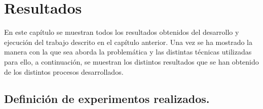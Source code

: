 
\chapter{Resultados}
En este capítulo se muestran todos los resultados obtenidos del desarrollo y ejecución del trabajo descrito en el capítulo anterior. Una vez se ha mostrado la manera con la que sea aborda la problemática y las distintas técnicas utilizadas para ello, a continuación, se muestran los distintos resultados que se han obtenido de los distintos procesos desarrollados.

\section{Definición de experimentos realizados.}\label{sec:definicion_experimentos}

